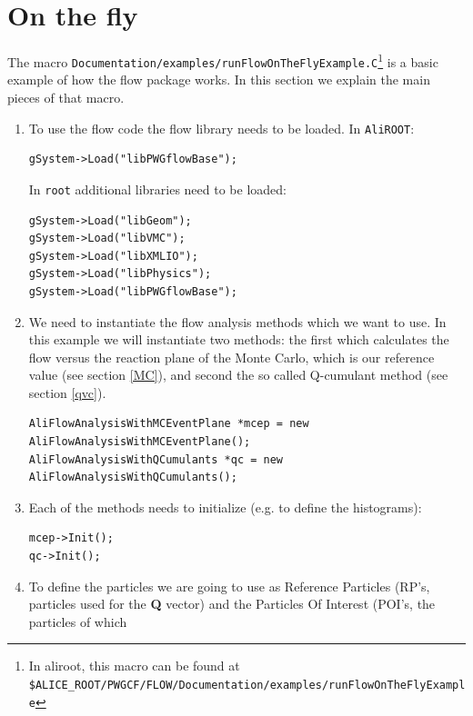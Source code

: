 \documentclass[a5paper]{book}
\numberwithin{equation}{subsection}
\begin{document}
\section{On the fly}
The macro \texttt{Documentation/examples/runFlowOnTheFlyExample.C}\footnote{In aliroot, this macro can be found at \\ \texttt{\$ALICE\_ROOT/PWGCF/FLOW/Documentation/examples/runFlowOnTheFlyExample}} is a basic example of how the flow package works. 
In this section we explain the main pieces of that macro.
\begin{enumerate}
	\item To use the flow code the flow library needs to be loaded. In \texttt{AliROOT}:
	\begin{lstlisting}
gSystem->Load("libPWGflowBase");\end{lstlisting}
	In \texttt{root} additional libraries need to be loaded: 
	\begin{lstlisting}
gSystem->Load("libGeom");
gSystem->Load("libVMC");
gSystem->Load("libXMLIO");
gSystem->Load("libPhysics");
gSystem->Load("libPWGflowBase");\end{lstlisting}
	\item We need to instantiate the flow analysis methods which we want to use. In this example we will
	instantiate two methods: the first which calculates the flow versus the reaction plane of the Monte Carlo, which is our reference value (see section \ref{MC}), and second the so called Q-cumulant method (see section \ref{qvc}).
	\begin{lstlisting}
AliFlowAnalysisWithMCEventPlane *mcep = new AliFlowAnalysisWithMCEventPlane();
AliFlowAnalysisWithQCumulants *qc = new AliFlowAnalysisWithQCumulants();\end{lstlisting}
	\item Each of the methods needs to initialize (e.g. to define the histograms): 
	\begin{lstlisting}
mcep->Init(); 
qc->Init();\end{lstlisting}
	\item To define the particles we are going to use as Reference Particles  (RP's, particles 
	used for the {\bf Q} vector) and the Particles Of Interest  (POI's, the particles of which 

\end{enumerate}
\end{document}
